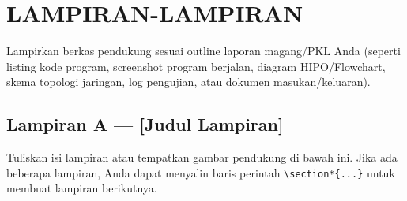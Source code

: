 \clearpage
\chapter*{LAMPIRAN-LAMPIRAN}
\label{lamp:lampiran-utama}
\appendix

Lampirkan berkas pendukung sesuai outline laporan magang/PKL Anda (seperti listing kode program, screenshot program berjalan, diagram HIPO/Flowchart, skema topologi jaringan, log pengujian, atau dokumen masukan/keluaran).

\section*{Lampiran A --- [Judul Lampiran]}
\noindent
Tuliskan isi lampiran atau tempatkan gambar pendukung di bawah ini. Jika ada beberapa lampiran, Anda dapat menyalin baris perintah \texttt{\textbackslash{}section*\{...\}} untuk membuat lampiran berikutnya.
